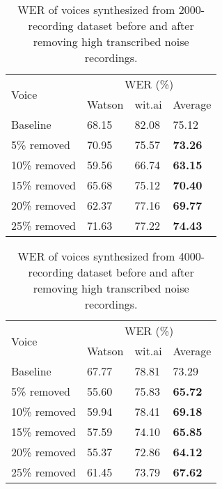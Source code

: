 \documentclass[12pt]{article}
\begin{document}
\begin{table}[]
\begin{center}
\caption{WER of voices synthesized from 2000-recording dataset before and after removing high transcribed noise recordings.}
\label{tab_werTranscribedNoise2000}
\vspace{3mm}
\begin{tabular}{|l|l|l|l|}
\hline
\multirow{2}{2.5cm}{Voice} &
\multicolumn{3}{c|}{WER (\%)} \\ \cline{2-4}
& Watson & wit.ai & Average \\
\hline
Baseline     & 68.15 & 82.08 & 75.12 \\
5\% removed  & 70.95 & 75.57 & \textbf{73.26} \\
10\% removed & 59.56 & 66.74 & \textbf{63.15} \\
15\% removed & 65.68 & 75.12 & \textbf{70.40} \\
20\% removed & 62.37 & 77.16 & \textbf{69.77} \\
25\% removed & 71.63 & 77.22 & \textbf{74.43} \\
\hline
\end{tabular}
\end{center}
\end{table}

\begin{table}[]
\begin{center}
\caption{WER of voices synthesized from 4000-recording dataset before and after removing high transcribed noise recordings.}
\label{tab_werTranscribedNoise4000}
\vspace{3mm}
\begin{tabular}{|l|l|l|l|}
\hline
\multirow{2}{2.5cm}{Voice} &
\multicolumn{3}{c|}{WER (\%)} \\ \cline{2-4}
& Watson & wit.ai & Average \\
\hline
Baseline     & 67.77 & 78.81 & 73.29 \\
5\% removed  & 55.60 & 75.83 & \textbf{65.72} \\
10\% removed & 59.94 & 78.41 & \textbf{69.18} \\
15\% removed & 57.59 & 74.10 & \textbf{65.85} \\
20\% removed & 55.37 & 72.86 & \textbf{64.12} \\
25\% removed & 61.45 & 73.79 & \textbf{67.62} \\
\hline
\end{tabular}
\end{center}
\end{table}
\end{document}
